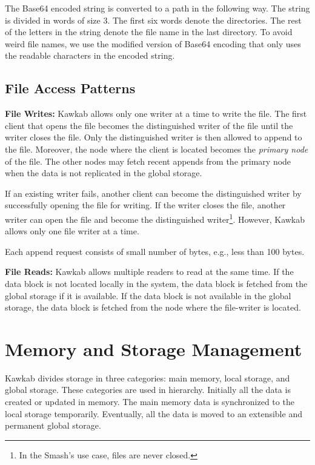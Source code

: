 \documentclass[]{article}
\newcommand{\subtopic}[1]{\vspace{1.5pt} \noindent \textbf{#1}}
\begin{document}
The Base64 encoded string is converted to a path in the following way.  The
string is divided in words of size 3. The first six words denote the
directories. The rest of the letters in the string denote the file name in the
last directory. To avoid weird file names, we use the modified version of
Base64 encoding that only uses the readable characters in the encoded string.




\subsection{File Access Patterns}

\subtopic{File Writes:} Kawkab allows only one writer at a time to write the
file. The first client that opens the file becomes the distinguished writer of
the file until the writer closes the file. Only the distinguished writer is
then allowed to append to the file. Moreover, the node where the client is
located becomes the \textit{primary node} of the file.  The other nodes may
fetch recent appends from the primary node when the data is not replicated in
the global storage.

If an existing writer fails, another client can become the distinguished writer
by successfully opening the file for writing. If the writer closes the file,
another writer can open the file and become the distinguished
writer\footnote{In the Smash's use case, files are never closed.}. However,
Kawkab allows only one file writer at a time.

Each append request consists of small number of bytes, e.g., less than 100 bytes.

\subtopic{File Reads:}
Kawkab allows multiple readers to read at the same time. If the data block
is not located locally in the system, the data block is fetched from the global storage if
it is available. If the data block is not available in the global storage, the data block
is fetched from the node where the file-writer is located.





\section{Memory and Storage Management}

Kawkab divides storage in three categories: main memory, local storage, and global
storage. These categories are used in hierarchy. Initially all the data
is created or updated in memory. The main memory data is synchronized to the
local storage temporarily. Eventually, all the data is moved to an extensible
and permanent global storage.
\end{document}
